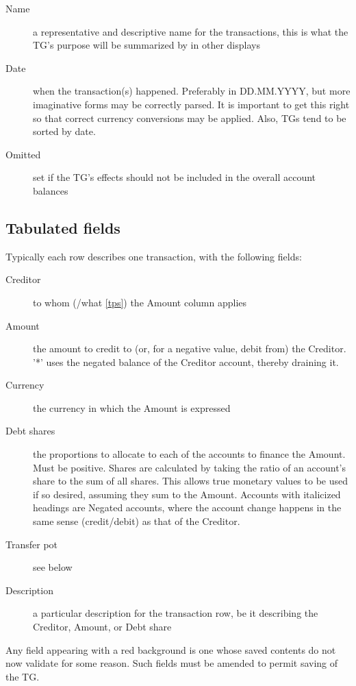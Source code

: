 \documentclass{report}
\begin{document}
\begin{description}
\item [Name] a representative and descriptive name for the transactions, this is what the TG's purpose will be summarized by in other displays
\item [Date] when the transaction(s) happened. Preferably in DD.MM.YYYY, but more imaginative forms may be correctly parsed. It is important to get this right so that correct currency conversions may be applied. Also, TGs tend to be sorted by date.
\item [Omitted] set if the TG's effects should not be included in the overall account balances
\end{description}

\subsection{Tabulated fields}

Typically each row describes one transaction, with the following fields:

\begin{description}
\item [Creditor] to whom (/what \autoref{tps}) the Amount column applies
\item [Amount] the amount to credit to (or, for a negative value, debit from) the Creditor. '*' uses the negated balance of the Creditor account, thereby draining it.
\item [Currency] the currency in which the Amount is expressed
\item [Debt shares] the proportions to allocate to each of the accounts to finance the Amount. Must be positive. Shares are calculated by taking the ratio of an account's share to the sum of all shares. This allows true monetary values to be used if so desired, assuming they sum to the Amount. Accounts with italicized headings are Negated accounts, where the account change happens in the same sense (credit/debit) as that of the Creditor.
\item [Transfer pot] see below
\item [Description] a particular description for the transaction row, be it describing the Creditor, Amount, or Debt share
\end{description}

Any field appearing with a red background is one whose saved contents do not now validate for some reason. Such fields must be amended to permit saving of the TG.
\end{document}
